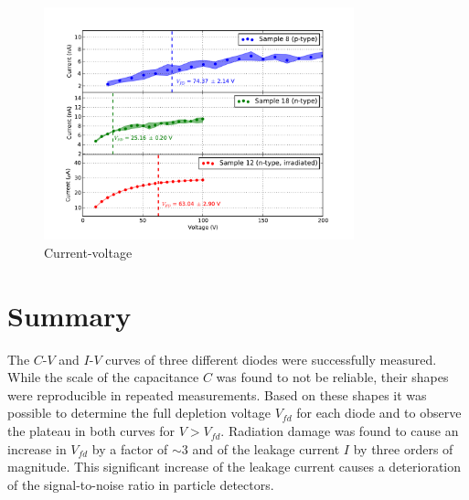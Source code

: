 \documentclass[11pt,a4paper]{report}
\begin{document}
\begin{figure}
  \centering
  \includegraphics[width=0.8\textwidth]{./figures/iv.pdf}
  \caption{Current-voltage}
  \label{fig:iv}
\end{figure}



\section*{Summary}
\label{sec:summary}

The $C$-$V$ and $I$-$V$ curves of three different diodes were successfully measured.
While the scale of the capacitance $C$ was found to not be reliable, their shapes were reproducible in repeated measurements.
Based on these shapes it was possible to determine the full depletion voltage $V_{fd}$ for each diode and to observe the plateau in both curves for $V>V_{fd}$.
Radiation damage was found to cause an increase in $V_{fd}$ by a factor of $\sim 3$ and of the leakage current $I$ by three orders of magnitude.
This significant increase of the leakage current causes a deterioration of the signal-to-noise ratio in particle detectors.

\printbibliography
\end{document}
